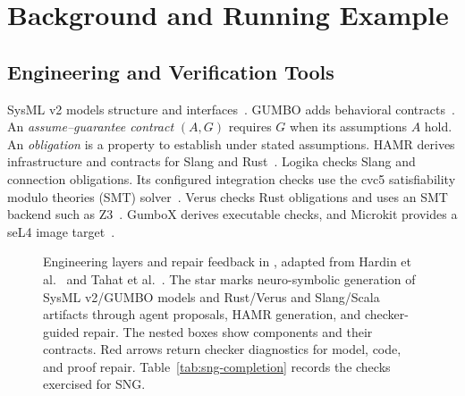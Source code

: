 \section{Background and Running Example}
\label{sec:background}

\subsection{Engineering and Verification Tools}
SysML v2 models structure and interfaces~\cite{sysmlv2_omg}. GUMBO adds behavioral contracts~\cite{gumbo}. An \emph{assume--guarantee contract} $(A,G)$ requires $G$ when its assumptions $A$ hold. An \emph{obligation} is a property to establish under stated assumptions. HAMR derives infrastructure and contracts for Slang and Rust~\cite{hamr}. Logika checks Slang and connection obligations. Its configured integration checks use the cvc5 satisfiability modulo theories (SMT) solver~\cite{hallerstede2025logika,scpCheckpoint}. Verus checks Rust obligations and uses an SMT backend such as Z3~\cite{verusGuide}. GumboX derives executable checks, and Microkit provides a seL4 image target~\cite{hamrGumboxRust,hamr-sel4}.

\begin{figure}[t]
\centering
\resizebox{\textwidth}{!}{}
\caption{Engineering layers and repair feedback in \workbench{}, adapted from Hardin et al.~\cite{hardin2025dasc} and Tahat et al.~\cite{tahat2026scp,tahat2026dascslides}. The star marks neuro-symbolic generation of SysML v2/GUMBO models and Rust/Verus and Slang/Scala artifacts through agent proposals, HAMR generation, and checker-guided repair. The nested boxes show components and their contracts. Red arrows return checker diagnostics for model, code, and proof repair. Table~\ref{tab:sng-completion} records the checks exercised for SNG.}
\label{fig:engineering-stack}
\end{figure}

